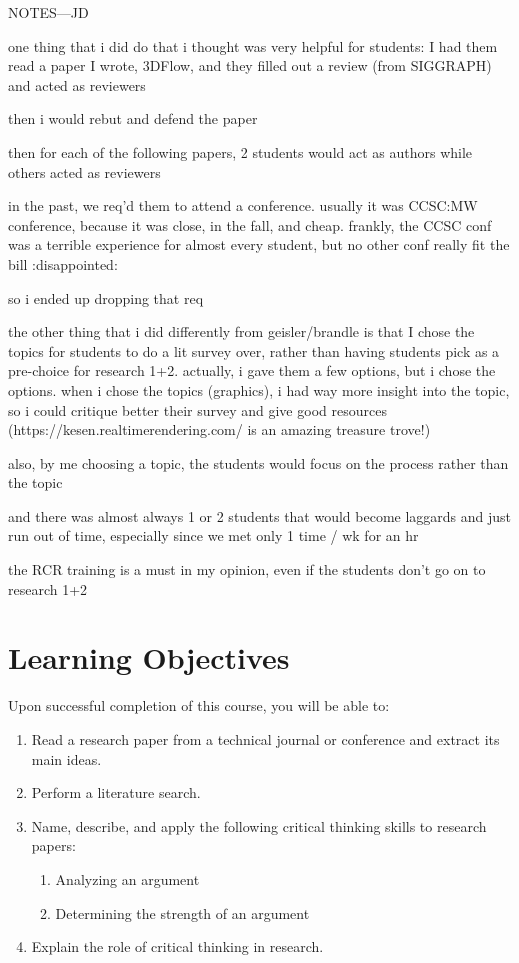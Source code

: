 \documentclass[11pt]{article}
\begin{document}
NOTES---JD

one thing that i did do that i thought was very helpful for students: I had
them read a paper I wrote, 3DFlow, and they filled out a review (from SIGGRAPH)
and acted as reviewers

then i would rebut and defend the paper

then for each of the following papers, 2 students would act as authors while
others acted as reviewers

in the past, we req’d them to attend a conference.  usually it was CCSC:MW
conference, because it was close, in the fall, and cheap.  frankly, the CCSC
conf was a terrible experience for almost every student, but no other conf
really fit the bill :disappointed:

so i ended up dropping that req

the other thing that i did differently from geisler/brandle is that I chose the
topics for students to do a lit survey over, rather than having students pick
as a pre-choice for research 1+2.  actually, i gave them a few options, but i
chose the options.  when i chose the topics (graphics), i had way more insight
into the topic, so i could critique better their survey and give good resources
(https://kesen.realtimerendering.com/ is an amazing treasure trove!)

also, by me choosing a topic, the students would focus on the process rather
than the topic

and there was almost always 1 or 2 students that would become laggards and just
run out of time, especially since we met only 1 time / wk for an hr

the RCR training is a must in my opinion, even if the students don’t go on to
research 1+2

\section{Learning Objectives}

Upon successful completion of this course,
you will be able to:
\begin{enumerate}
\item Read a research paper from a technical journal or conference and extract its main ideas.
\item Perform a literature search.
\item Name, describe, and apply the following critical thinking skills to research papers:
  \begin{enumerate}
  \item Analyzing an argument
  \item Determining the strength of an argument
  \end{enumerate}
\item Explain the role of critical thinking in research.
\end{enumerate}
\end{document}
